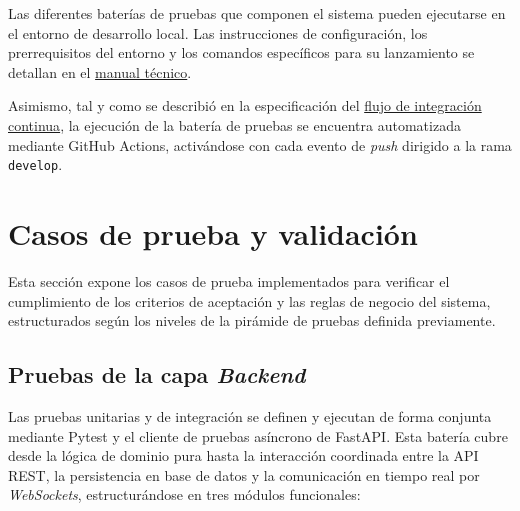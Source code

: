 Las diferentes baterías de pruebas que componen el sistema pueden ejecutarse en el entorno de desarrollo local. Las instrucciones de configuración, los prerrequisitos del entorno y los comandos específicos para su lanzamiento se detallan en el \hyperref[anexo:manual_tecnico]{manual técnico}.

Asimismo, tal y como se describió en la especificación del \hyperref[subsec:pipeline_ci]{flujo de integración continua}, la ejecución de la batería de pruebas se encuentra automatizada mediante GitHub Actions, activándose con cada evento de \textit{push} dirigido a la rama \texttt{develop}.

\section{Casos de prueba y validación}\label{sec:casos_de_prueba_y_validacion}

Esta sección expone los casos de prueba implementados para verificar el cumplimiento de los criterios de aceptación y las reglas de negocio del sistema, estructurados según los niveles de la pirámide de pruebas definida previamente.

\subsection{Pruebas de la capa \textit{Backend}}\label{subsec:casos_backend}

Las pruebas unitarias y de integración se definen y ejecutan de forma conjunta mediante Pytest y el cliente de pruebas asíncrono de FastAPI. Esta batería cubre desde la lógica de dominio pura hasta la interacción coordinada entre la API REST, la persistencia en base de datos y la comunicación en tiempo real por \textit{WebSockets}, estructurándose en tres módulos funcionales:

